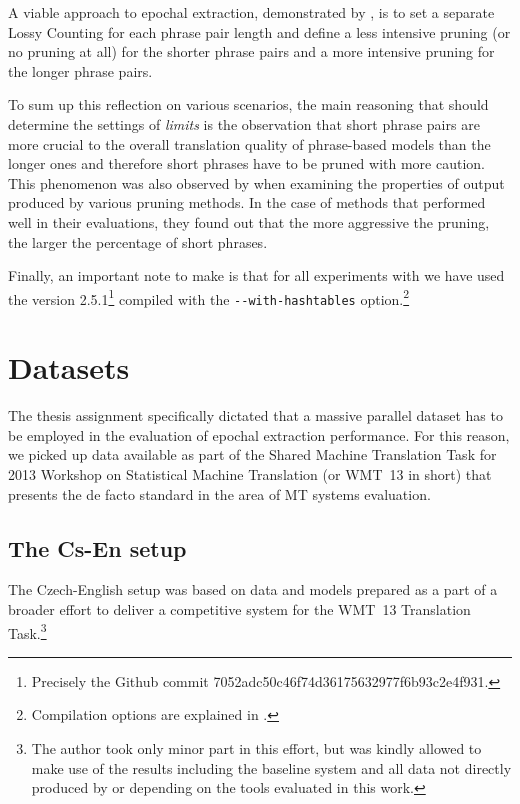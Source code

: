 A viable approach to epochal extraction, demonstrated by \citet{przywara:eppex},
is to set a separate Lossy Counting for each phrase pair length and define a less
intensive pruning (or no pruning at all) for the shorter phrase pairs and
a more intensive pruning for the longer phrase pairs.

To sum up this reflection on various \eppex{} scenarios, the main reasoning that should
determine the settings of \emph{limits} is the observation that short phrase pairs are
more crucial to the overall translation quality of phrase-based models than the longer ones
and therefore short phrases have to be pruned with more caution.
This phenomenon was also observed by \citet{zens:systcomp} when examining the
properties of output produced by various pruning methods. In the case of methods that
performed well in their evaluations, they found out that the more aggressive the pruning,
the larger the percentage of short phrases.

Finally, an important note to make is that for all experiments with \eppex{} we have used
the version 2.5.1\footnote{Precisely the Github commit 7052adc50c46f74d36175632977f6b93c2e4f931.}
compiled with the \verb|--with-hashtables| option.\footnote{Compilation options are explained in
.}

\section{Datasets}

The thesis assignment specifically dictated that a massive parallel dataset has to be
employed in the evaluation of epochal extraction performance.
For this reason, we picked up data available as part of the Shared Machine Translation Task
for 2013 Workshop on Statistical Machine Translation (or WMT~13 in short) that presents
the de facto standard in the area of MT systems evaluation.

\subsection{The Cs-En setup}

The Czech-English setup was based on data and models prepared as a part of a broader
effort to deliver a competitive system for the WMT~13 Translation Task.\footnote{The author
took only minor part in this effort, but was kindly allowed to make use of the results
including the baseline system and all data not directly produced by or depending on
the tools evaluated in this work.}

